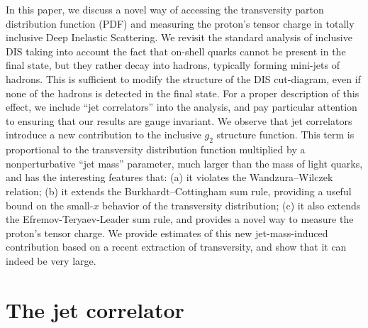 \documentclass[preprintnumbers,floatfix,nofootinbib]{revtex4}
\begin{document}
In this paper, we discuss a novel way of accessing the transversity parton distribution function (PDF) and measuring the proton's tensor charge in totally inclusive Deep Inelastic Scattering. 
We revisit the standard analysis of inclusive DIS taking into account the fact
that on-shell quarks cannot be present in the final state, but they rather
decay into hadrons, typically forming mini-jets of hadrons. This is sufficient to modify the structure of the DIS
cut-diagram, even if none of the hadrons is detected in the final
state. For a proper description of this effect, we include ``jet
correlators'' into the analysis, and pay particular attention to ensuring that our results are gauge invariant. We observe that jet correlators introduce a new
contribution to the inclusive $g_2$ structure function. This term is
proportional to the transversity distribution function multiplied by a
nonperturbative ``jet mass'' parameter, much larger than the mass of light quarks, and has the interesting features that:
(a) it violates the Wandzura--Wilczek relation;
(b) it extends the Burkhardt--Cottingham sum rule, providing a useful bound on the small-$x$ behavior of the transversity distribution;
(c) it also extends the Efremov-Teryaev-Leader sum rule, and provides a novel way to measure the proton's tensor charge.
We provide estimates of this new jet-mass-induced contribution based on a recent extraction of transversity, and show that it can indeed be very large.   
 

\section{The jet correlator}
\end{document}
